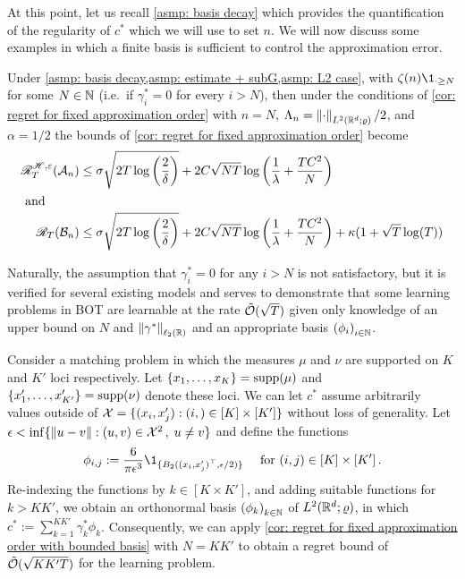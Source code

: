At this point, let us recall \cref{asmp: basis decay} which provides the quantification of the regularity of $c^*$ which we will use to set $n$.  We will now discuss some examples in which a finite basis is sufficient to control the approximation error.

\asmpthree*


\begin{proposition}\label{cor: regret for fixed approximation order with bounded basis}
    Under \cref{asmp: basis decay,asmp: estimate + subG,asmp: L2 case}, with $\zeta(n)\1_{\cdot\ge N}$ for some $N\in\mathbb{N}$ (i.e.\ if $\gamma_i^*=0$ for every $i>N$), then under the conditions of \cref{cor: regret for fixed approximation order} with $n=N$, $\Lambda_n=\left\lVert\cdot\right\rVert_{L^2(\mathbb{R}^d;\varrho)}/2$, and $\alpha=1/2$ the bounds of \cref{cor: regret for fixed approximation order} become
    \begin{align}
        \mathscr{R}_T^{\mathscr{H},\varepsilon} (\mathcal{A}_n)&\le \sigma\sqrt{2T\log\left(\frac2\delta\right)} + 2C\sqrt{NT}\log\left(\frac{1}\lambda + \frac{T C^2}N\right) \label{eq: entropic regret for fixed approximation order with bounded basis}\\
        \intertext{ and }
        \mathscr{R}_T(\mathcal{B}_n)&\le  \sigma\sqrt{2T\log\left(\frac2\delta\right)} + 2C\sqrt{NT}\log\left(\frac{1}\lambda + \frac{T C^2}N\right) +\kappa(1+\sqrt{T}\log(T))\label{eq: kantorovich regret for fixed approximation order with bounded basis}
    \end{align}
\end{proposition}


Naturally, the assumption that $\gamma_i^*=0$ for any $i>N$ is not satisfactory, but it is verified for several existing models and serves to demonstrate that some learning problems in BOT are learnable at the rate $\tilde{\mathcal{O}}(\sqrt{T})$ given only knowledge of an upper bound on $N$ and $\left\lVert\gamma^*\right\rVert_{\ell_2(\mathbb{R})}$ and an appropriate basis ${(\phi_i)}_{i\in\mathbb{N}}$.  

Consider a matching problem in which the measures $\mu$ and $\nu$ are supported on $K$ and $K'$ loci respectively. Let $\{x_1,\ldots, x_K\}=\text{supp}(\mu)$ and $\{x'_1,\ldots, x'_{K'}\}=\text{supp}(\nu)$ denote these loci. We can let $c^*$ assume arbitrarily values outside of $\mathcal{X}=\{(x_i,x_j'):(i,)\in[K]\times [K']\}$ without loss of generality. Let $\epsilon<\inf\{\left\lVert u-v\right\rVert:(u,v)\in\mathcal{X}^2\,,\; u\neq v\}$ and define the functions 
\[
    \phi_{i,j}:= \frac{6}{\pi\epsilon^3}\1_{\{B_2({(x_i,x_j')}^\top,\epsilon/2)\}} \quad \mbox{ for } (i,j)\in[K]\times[K']\,.
\]
Re-indexing the functions by $k\in[K\times K']$, and adding suitable functions for $k>KK'$, we obtain an orthonormal basis ${(\phi_k)}_{k\in\mathbb{N}}$ of $L^2(\mathbb{R}^d;\varrho)$, in which $c^*:=\sum_{k=1}^{KK'}\gamma_k^*\phi_k$. Consequently, we can apply \cref{cor: regret for fixed approximation order with bounded basis} with $N=KK'$ to obtain a regret bound of $\tilde{\mathcal{O}}(\sqrt{KK'T})$ for the learning problem.

